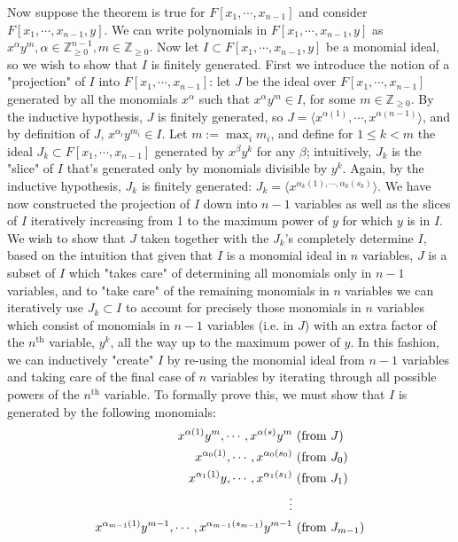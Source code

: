 \documentclass{article}
\begin{document}
\newline
\indent Now suppose the theorem is true for $ F[x_1, \cdots, x_{n - 1}] $ and consider $ F[x_1, \cdots, x_{n - 1}, y] $. We can write polynomials in $ F[x_1, \cdots, x_{n - 1}, y] $ as $ x^\alpha y^m, \alpha \in \mathbb{Z}_{\geq 0}^{n - 1}, m \in \mathbb{Z}_{\geq 0} $. Now let $ I \subset F[x_1, \cdots, x_{n - 1}, y] $ be a monomial ideal, so we wish to show that $ I $ is finitely generated. First we introduce the notion of a "projection" of $ I $ into $ F[x_1, \cdots, x_{n - 1}] $: let $ J $ be the ideal over $ F[x_1, \cdots, x_{n - 1}] $ generated by all the monomials $ x^\alpha $ such that $ x^\alpha y^m \in I $, for some $ m \in \mathbb{Z}_{\geq 0} $. By the inductive hypothesis, $ J $ is finitely generated, so $ J = \langle x^{\alpha(1)}, \cdots, x^{\alpha(n - 1)} \rangle $, and by definition of $ J $, $ x^{\alpha_i} y^{m_i} \in I $. 
\newline
\indent Let $ m := \max_i m_i $, and define for $ 1 \leq k < m $ the ideal $ J_k \subset F[x_1, \cdots, x_{n - 1}] $ generated by $ x^\beta y^k $ for any $ \beta $; intuitively, $ J_k $ is the "slice" of $ I $ that's generated only by monomials divisible by $ y^k $. Again, by the inductive hypothesis, $ J_k $ is finitely generated: $ J_k = \langle x^{\alpha_k(1), \cdots, \alpha_k(s_k)} \rangle $. We have now constructed the projection of $ I $ down into $ n - 1 $ variables as well as the slices of $ I $ iteratively increasing from 1 to the maximum power of $ y $ for which $ y $ is in $ I $. We wish to show that $ J $ taken together with the $ J_k $'s completely determine $ I $, based on the intuition that given that $ I $ is a monomial ideal in $ n $ variables, $ J $ is a subset of $ I $ which "takes care" of determining all monomials only in $ n - 1 $ variables, and to "take care" of the remaining monomials in $ n $ variables we can iteratively use $ J_k \subset I $ to account for precisely those monomials in $ n $ variables which consist of monomials in $ n - 1 $ variables (i.e. in $ J $) with an extra factor of the $ n^{\text{th}} $ variable, $ y^k $, all the way up to the maximum power of $ y $. In this fashion, we can inductively "create" $ I $ by re-using the monomial ideal from $ n - 1 $ variables and taking care of the final case of $ n $ variables by iterating through all possible powers of the $ n^{\text{th}} $ variable.
\newline
\indent To formally prove this, we must show that $ I $ is generated by the following monomials:
$$ \begin{aligned}
	x^{\alpha(1)} y^m, \cdots, x^{\alpha(s)} y^m &\text{ (from $ J $)} \\
	x^{\alpha_0(1)}, \cdots, x^{\alpha_0(s_0)} &\text{ (from $ J_0 $)} \\
	x^{\alpha_1(1)} y, \cdots, x^{\alpha_1(s_1)} &\text{ (from $ J_1 $)} \\
	\vdots \\
	x^{\alpha_{m - 1}(1)} y^{m - 1}, \cdots, x^{\alpha_{m - 1}(s_{m - 1})} y^{m - 1} &\text{ (from $ J_{m - 1} $)}
\end{aligned} $$
\end{document}
